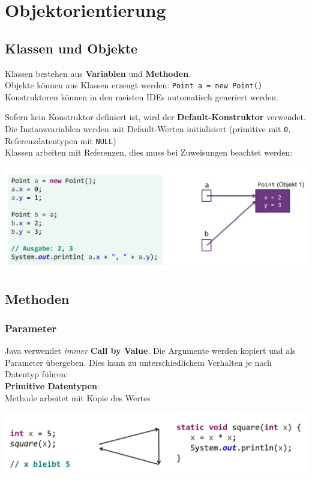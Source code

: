 \section{Objektorientierung}

\subsection{Klassen und Objekte}{\label{Klassen}}
Klassen bestehen aus \textbf{Variablen} und \textbf{Methoden}.\\
Objekte können aus Klassen erzeugt werden: \verb|Point a = new Point()|\\
Konstruktoren können in den meisten IDEs automatisch generiert werden.

Sofern kein Konstruktor definiert ist, wird der \textbf{Default-Konstruktor} verwendet. Die Instanzvariablen werden mit
Default-Werten initialisiert (primitive mit \verb|0|, Referenzdatentypen mit \verb|NULL|)\\

Klassen arbeiten mit Referenzen, dies muss bei Zuweisungen beachtet werden:
\begin{center}
    \includegraphics[width=0.9\columnwidth]{pictures/copy-semantics.png}    
\end{center}

\subsection{Methoden}

\subsubsection{Parameter}
Java verwendet \textit{immer} \textbf{Call by Value}. Die Argumente werden kopiert und als Parameter übergeben. Dies kann zu unterschiedlichem Verhalten
je nach Datentyp führen:\\

\textbf{Primitive Datentypen}:\\
Methode arbeitet mit Kopie des Wertes
\begin{center}
    \includegraphics[width=0.9\columnwidth]{pictures/primitive-params.png}    
\end{center}

